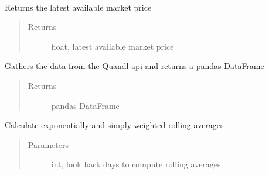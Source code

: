 \documentclass[letterpaper,10pt,english]{sphinxmanual}
\begin{document}
\begin{fulllineitems}
\label{\detokenize{market_data:risk_dash.market_data.QuandlStockData}}~

\begin{fulllineitems}
\label{\detokenize{market_data:risk_dash.market_data.QuandlStockData.current_price}}
Returns the latest available market price
\begin{quote}\begin{description}
\item[{Returns}] \leavevmode
float, latest available market price

\end{description}\end{quote}

\end{fulllineitems}


\begin{fulllineitems}
\label{\detokenize{market_data:risk_dash.market_data.QuandlStockData.gather}}
Gathers the data from the Quandl api and returns a pandas DataFrame
\begin{quote}\begin{description}
\item[{Returns}] \leavevmode
pandas DataFrame

\end{description}\end{quote}

\end{fulllineitems}


\begin{fulllineitems}
\label{\detokenize{market_data:risk_dash.market_data.QuandlStockData.set_expected}}
Calculate exponentially and simply weighted rolling averages
\begin{quote}\begin{description}
\item[{Parameters}] \leavevmode
{} \textendash{} int, look back days to compute rolling averages


\end{description}
\end{quote}
\end{fulllineitems}
\end{fulllineitems}
\end{document}
